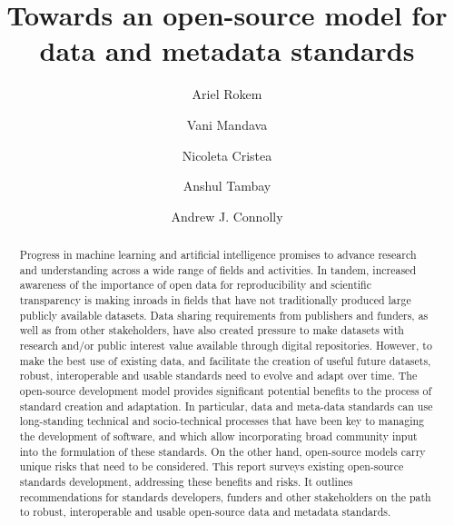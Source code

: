 \documentclass[
  number]{elsarticle}
\begin{document}
\begin{frontmatter}
\title{Towards an open-source model for data and metadata standards}
\author[1,2]{Ariel Rokem%
%
}
\author[3,2]{Vani Mandava%
%
}

\author[4,2]{Nicoleta Cristea%
%
}

\author[3,2]{Anshul Tambay%
%
}

\author[5,2]{Andrew J. Connolly%
%
}








        
\begin{abstract}
Progress in machine learning and artificial intelligence promises to
advance research and understanding across a wide range of fields and
activities. In tandem, increased awareness of the importance of open
data for reproducibility and scientific transparency is making inroads
in fields that have not traditionally produced large publicly available
datasets. Data sharing requirements from publishers and funders, as well
as from other stakeholders, have also created pressure to make datasets
with research and/or public interest value available through digital
repositories. However, to make the best use of existing data, and
facilitate the creation of useful future datasets, robust, interoperable
and usable standards need to evolve and adapt over time. The open-source
development model provides significant potential benefits to the process
of standard creation and adaptation. In particular, data and meta-data
standards can use long-standing technical and socio-technical processes
that have been key to managing the development of software, and which
allow incorporating broad community input into the formulation of these
standards. On the other hand, open-source models carry unique risks that
need to be considered. This report surveys existing open-source
standards development, addressing these benefits and risks. It outlines
recommendations for standards developers, funders and other stakeholders
on the path to robust, interoperable and usable open-source data and
metadata standards.
\end{abstract}





\end{frontmatter}
    
\end{document}
